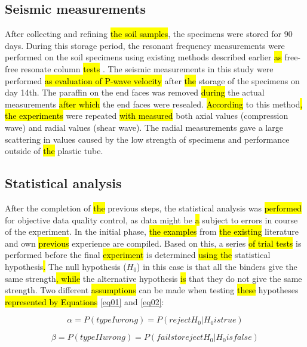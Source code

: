 \documentclass[constrmater,article,submit,pdftex,moreauthors]{Definitions/mdpi}
\begin{document}
\subsection{Seismic measurements}
After collecting and refining \hl{the soil samples}, the specimens were stored for 90 days. During this storage period, the resonant frequency measurements\hl{ }were performed on the soil specimens using existing methods described earlier \hl{as} free-free resonate column \hl{tests} \citep{Aldaood,Lindh2021b,Lindh2022c,ThomasRangaswamy,Ryden}. The seismic measurements in this study were performed \hl{as evaluation of P-wave velocity }after \hl{the }storage of the specimens on day 14th. The paraffin on the end faces was removed \hl{during} the actual measurements \hl{after which} the end faces were resealed. \hl{According} to this method\hl{, the experiments} were repeated \hl{with measured} both axial values (compression wave) and radial values (shear wave). The radial measurements gave a large scattering in values caused by the low strength of specimens and performance outside of \hl{the} plastic tube.

\subsection{Statistical analysis}
After the completion of \hl{the} previous steps, the statistical analysis was \hl{performed} for objective data quality control, as data might be \hl{a} subject to errors in course of the experiment. In the initial phase, \hl{the examples} from \hl{the existing} literature and own \hl{previous} experience are compiled. Based on this, a\hl{ }series \hl{of trial tests }is performed before the final \hl{experiment} is determined\hl{ using the }statistical hypothesis\hl{. }The null hypothesis ($H_0$) in this case is that all the binders give the same strength\hl{, while }the alternative hypothesis \hl{is} that they do not give the same strength. Two different \hl{assumptions} can be made when testing \hl{these} hypotheses \hl{represented by Equations} \ref{eq01} and \ref{eq02}:

\begin{equation}\label{eq01}
	\alpha = P (type I wrong) = P(reject H_0 | H_0 is true)
\end{equation}

\begin{equation}\label{eq02}
	\beta = P (type II wrong) = P(fails to reject H_0 | H_0 is false)
\end{equation}
\end{document}
